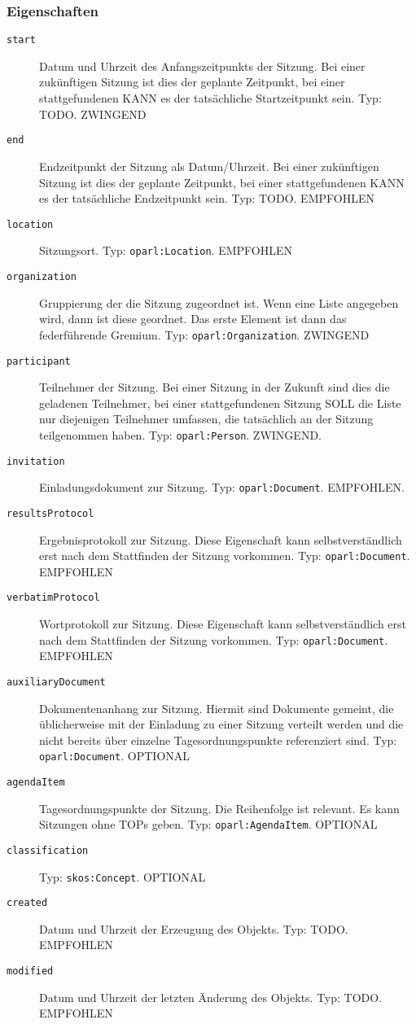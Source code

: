 \documentclass[,a4paper]{article}
\begin{document}
\subsubsection{Eigenschaften}\label{eigenschaften-4}

\begin{description}
\item[\texttt{start}]
Datum und Uhrzeit des Anfangszeitpunkts der Sitzung. Bei einer
zukünftigen Sitzung ist dies der geplante Zeitpunkt, bei einer
stattgefundenen KANN es der tatsächliche Startzeitpunkt sein. Typ: TODO.
ZWINGEND
\item[\texttt{end}]
Endzeitpunkt der Sitzung als Datum/Uhrzeit. Bei einer zukünftigen
Sitzung ist dies der geplante Zeitpunkt, bei einer stattgefundenen KANN
es der tatsächliche Endzeitpunkt sein. Typ: TODO. EMPFOHLEN
\item[\texttt{location}]
Sitzungsort. Typ: \texttt{oparl:Location}. EMPFOHLEN
\item[\texttt{organization}]
Gruppierung der die Sitzung zugeordnet ist. Wenn eine Liste angegeben
wird, dann ist diese geordnet. Das erste Element ist dann das
federführende Gremium. Typ: \texttt{oparl:Organization}. ZWINGEND
\item[\texttt{participant}]
Teilnehmer der Sitzung. Bei einer Sitzung in der Zukunft sind dies die
geladenen Teilnehmer, bei einer stattgefundenen Sitzung SOLL die Liste
nur diejenigen Teilnehmer umfassen, die tatsächlich an der Sitzung
teilgenommen haben. Typ: \texttt{oparl:Person}. ZWINGEND.
\item[\texttt{invitation}]
Einladungsdokument zur Sitzung. Typ: \texttt{oparl:Document}. EMPFOHLEN.
\item[\texttt{resultsProtocol}]
Ergebnisprotokoll zur Sitzung. Diese Eigenschaft kann selbstverständlich
erst nach dem Stattfinden der Sitzung vorkommen. Typ:
\texttt{oparl:Document}. EMPFOHLEN
\item[\texttt{verbatimProtocol}]
Wortprotokoll zur Sitzung. Diese Eigenschaft kann selbstverständlich
erst nach dem Stattfinden der Sitzung vorkommen. Typ:
\texttt{oparl:Document}. EMPFOHLEN
\item[\texttt{auxiliaryDocument}]
Dokumentenanhang zur Sitzung. Hiermit sind Dokumente gemeint, die
üblicherweise mit der Einladung zu einer Sitzung verteilt werden und die
nicht bereits über einzelne Tagesordnungspunkte referenziert sind. Typ:
\texttt{oparl:Document}. OPTIONAL
\item[\texttt{agendaItem}]
Tagesordnungspunkte der Sitzung. Die Reihenfolge ist relevant. Es kann
Sitzungen ohne TOPs geben. Typ: \texttt{oparl:AgendaItem}. OPTIONAL
\item[\texttt{classification}]
Typ: \texttt{skos:Concept}. OPTIONAL
\item[\texttt{created}]
Datum und Uhrzeit der Erzeugung des Objekts. Typ: TODO. EMPFOHLEN
\item[\texttt{modified}]
Datum und Uhrzeit der letzten Änderung des Objekts. Typ: TODO. EMPFOHLEN
\end{description}
\end{document}
